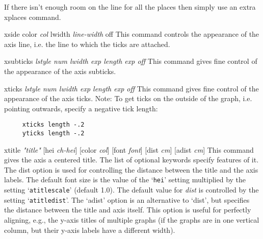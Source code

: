 \begin{commanddescription}
If there isn't enough room on the line for all the places then simply
use an extra {\sf xplaces} command.

\item[{\sf xside color {\it col} lwidth {\it line-width} off  } ]
This command controls the appearance of the axis line, i.e. the line
to which the ticks are attached.

\item[{\sf xsubticks {\it {\sf lstyle} num  {\sf lwidth} exp {\sf length} exp  {\sf off}}} ]
This command gives fine control of the appearance of the axis subticks.

\item[{\sf xticks {\it {\sf lstyle} num {\sf lwidth} exp {\sf length} exp {\sf off}}} ]
This command gives fine control of the appearance of the axis ticks.
Note: To get ticks on the outside of the graph, i.e. pointing outwards,
specify a negative tick length:

\preglecode{}
\begin{Verbatim}
     xticks length -.2
     yticks length -.2
\end{Verbatim}
\postglecode{}

\item[{\sf xtitle {\it "title"}  [hei {\it ch-hei}]  [color {\it col}] [font {\it font}] [dist {\it cm}] [adist {\it cm}]}]
This command gives the axis a centered title.  The list of optional keywords specify features of it.  The {\sf dist} option is used for controlling the distance between the title and the axis labels. The default font size is the value of the `\texttt{hei}' setting multiplied by the setting `\texttt{atitlescale}' (default 1.0). The default value for {\it dist} is controlled by the setting `\texttt{atitledist}'. The `{\sf adist}' option is an alternative to `{\sf dist}', but specifies the distance between the title and axis itself. This option is useful for perfectly aligning, e.g., the y-axis titles of multiple graphs (if the graphs are in one vertical column, but their y-axis labels have a different width).


\end{commanddescription}
